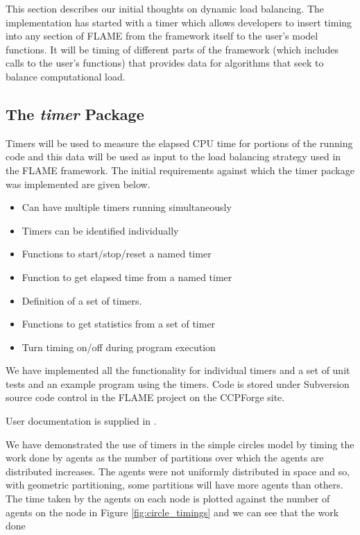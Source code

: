 This section describes our initial thoughts on dynamic load balancing. The implementation has started with a timer which allows developers to insert timing into any section of FLAME from the framework itself to the user's model functions. It will be timing of different parts of the framework (which includes calls to the user's functions) that provides data for algorithms that seek to balance computational load.

\subsection{The \textit{timer} Package}

Timers will be used to measure the elapsed CPU time for portions of the running code and this data will be used as input to the load balancing strategy used in the FLAME framework. The initial requirements against which the timer package was implemented are given below.

\begin{itemize}
\item Can have multiple timers running simultaneously
\item Timers can be identified individually
\item Functions to start/stop/reset a named timer
\item Function to get elapsed time from a named timer
\item Definition of a set of timers.
\item Functions to get statistics from a set of timer
\item Turn timing on/off during program execution 
\end{itemize}

We have implemented all the functionality for individual timers and a set of unit tests and an example program using the timers. Code is stored under Subversion source code control in the FLAME project on the CCPForge site. 

User documentation is supplied in \cite{TimerAPI}.

We have demonstrated the use of timers in the simple circles model by timing the work done by agents as the number of partitions over which the agents are distributed increases. The agents were not uniformly distributed in space and so, with geometric partitioning, some partitions will have more agents than others. The time taken by the agents on each node is plotted against the number of agents on the node in Figure \ref{fig:circle_timings} and we can see that the work done 

